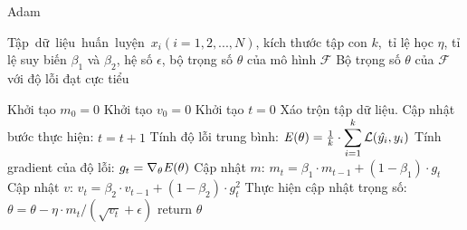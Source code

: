 \begin{algorithm}
	\caption{Adam} \label{alg:adam-complete}
	\begin{algorithmic}[1]
		\renewcommand{\algorithmicrequire}{\textbf{Đầu vào:}}
		\renewcommand{\algorithmicensure}{\textbf{Đầu ra:}}
		\algnewcommand{}
		\algnewcommand\Operation{\item[\algorithmicoperation]}

		\Require Tập dữ liệu huấn luyện $x_i (i = 1, 2, ..., N)$, kích thước tập con $k$, tỉ lệ học $\eta$, tỉ lệ suy biến $\beta_1$ và $\beta_2$, hệ số $\epsilon$, bộ trọng số $\theta$ của mô hình $\mathcal{F}$
		\Ensure Bộ trọng số $\theta$ của $\mathcal{F}$ với độ lỗi đạt cực tiểu

		\Operation
		\State Khởi tạo $m_0=0$
		\State Khởi tạo $v_0=0$
		\State Khởi tạo $t=0$
			\State Xáo trộn tập dữ liệu.
				\State Cập nhật bước thực hiện: $t=t+1$
				\State Tính độ lỗi trung bình: $\mathbf{\it{E}(\theta)} = \frac{1}{k}\cdot \displaystyle\sum_{i=1}^{k}\mathcal{L}(\hat{y_i}, y_i)$
				\State Tính gradient của độ lỗi: $g_t =\nabla_{\theta} \mathbf{\it{E}(\theta)}$
				\State Cập nhật $m$: $m_t = \beta_1\cdot m_{t-1} + (1-\beta_1)\cdot g_t$
				\State Cập nhật $v$: $v_t = \beta_2\cdot v_{t-1} + (1-\beta_2)\cdot g^{2}_{t}$
				\State Thực hiện cập nhật trọng số: $\theta = \theta - \eta\cdot m_t/(\sqrt{v_t} + \epsilon)$
			\EndFor
		\EndWhile
		\State return $\theta$
	\end{algorithmic}
\end{algorithm}